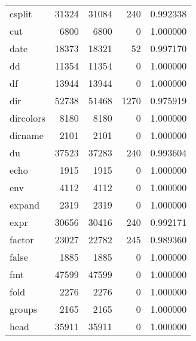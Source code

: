 \begin{longtable}{lrrrr}
csplit    &                    31324 &        31084 &           240 &                 0.992338 \\
cut       &                     6800 &         6800 &             0 &                 1.000000 \\
date      &                    18373 &        18321 &            52 &                 0.997170 \\
dd        &                    11354 &        11354 &             0 &                 1.000000 \\
df        &                    13944 &        13944 &             0 &                 1.000000 \\
dir       &                    52738 &        51468 &          1270 &                 0.975919 \\
dircolors &                     8180 &         8180 &             0 &                 1.000000 \\
dirname   &                     2101 &         2101 &             0 &                 1.000000 \\
du        &                    37523 &        37283 &           240 &                 0.993604 \\
echo      &                     1915 &         1915 &             0 &                 1.000000 \\
env       &                     4112 &         4112 &             0 &                 1.000000 \\
expand    &                     2319 &         2319 &             0 &                 1.000000 \\
expr      &                    30656 &        30416 &           240 &                 0.992171 \\
factor    &                    23027 &        22782 &           245 &                 0.989360 \\
false     &                     1885 &         1885 &             0 &                 1.000000 \\
fmt       &                    47599 &        47599 &             0 &                 1.000000 \\
fold      &                     2276 &         2276 &             0 &                 1.000000 \\
groups    &                     2165 &         2165 &             0 &                 1.000000 \\
head      &                    35911 &        35911 &             0 &                 1.000000 \\

\end{longtable}
